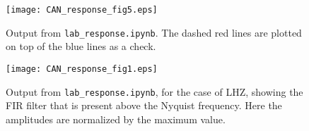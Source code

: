 \documentclass[11pt,titlepage,fleqn]{article}
\newcommand{\tfile}{{\tt lab\_response.ipynb}}
\begin{document}
\begin{figure}
\centering
\texttt{[image: CAN\_response\_fig5.eps]}
\caption[]
{{
Output from \tfile.
The dashed red lines are plotted on top of the blue lines as a check.
}}
\label{fig2}
\end{figure}

\begin{figure}
\centering
\texttt{[image: CAN\_response\_fig1.eps]}
\caption[]
{{
Output from \tfile, for the case of LHZ, showing the FIR filter that is present above the Nyquist frequency.
Here the amplitudes are normalized by the maximum value.
}}
\label{fig3}
\end{figure}

\end{document}

